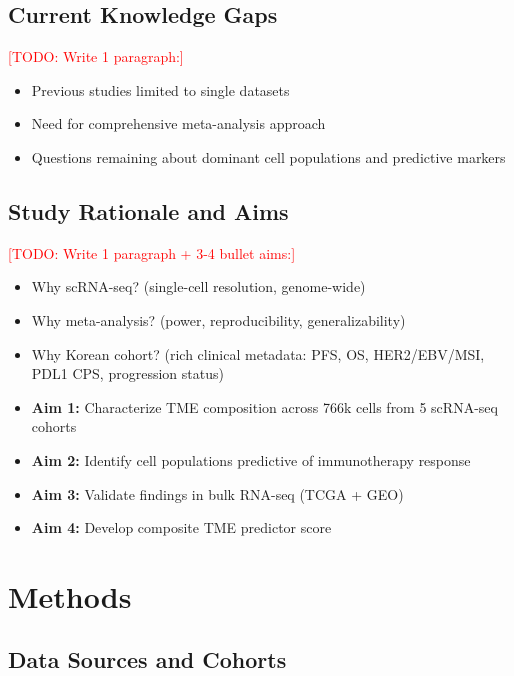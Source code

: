 \documentclass[12pt,oneside]{article}
\newcommand{\TODO}[1]{\textcolor{red}{[TODO: #1]}}
\begin{document}
\subsection{Current Knowledge Gaps}
\TODO{Write 1 paragraph:}
\begin{itemize}
    \item Previous studies limited to single datasets
    \item Need for comprehensive meta-analysis approach
    \item Questions remaining about dominant cell populations and predictive markers
\end{itemize}

\subsection{Study Rationale and Aims}
\TODO{Write 1 paragraph + 3-4 bullet aims:}
\begin{itemize}
    \item Why scRNA-seq? (single-cell resolution, genome-wide)
    \item Why meta-analysis? (power, reproducibility, generalizability)
    \item Why Korean cohort? (rich clinical metadata: PFS, OS, HER2/EBV/MSI, PDL1 CPS, progression status)
    \item \textbf{Aim 1:} Characterize TME composition across 766k cells from 5 scRNA-seq cohorts
    \item \textbf{Aim 2:} Identify cell populations predictive of immunotherapy response
    \item \textbf{Aim 3:} Validate findings in bulk RNA-seq (TCGA + GEO)
    \item \textbf{Aim 4:} Develop composite TME predictor score
\end{itemize}

\section{Methods}

\subsection{Data Sources and Cohorts}
\end{document}
